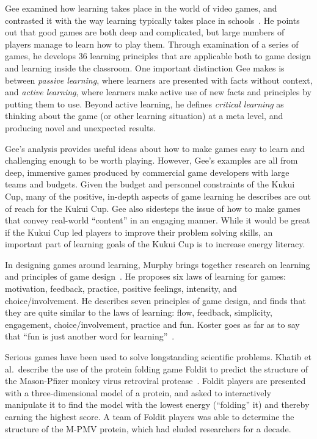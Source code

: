 Gee examined how learning takes place in the world of video games, and contrasted it with the way learning typically takes place in schools~\cite{Gee2007}. He points out that good games are both deep and complicated, but large numbers of players manage to learn how to play them. Through examination of a series of games, he develops 36 learning principles that are applicable both to game design and learning inside the classroom. One important distinction Gee makes is between \emph{passive learning}, where learners are presented with facts without context, and \emph{active learning}, where learners make active use of new facts and principles by putting them to use. Beyond active learning, he defines \emph{critical learning} as thinking about the game (or other learning situation) at a meta level, and producing novel and unexpected results.

Gee's analysis provides useful ideas about how to make games easy to learn and challenging enough to be worth playing. However, Gee's examples are all from deep, immersive games produced by commercial game developers with large teams and budgets. Given the budget and personnel constraints of the Kukui Cup, many of the positive, in-depth aspects of game learning he describes are out of reach for the Kukui Cup. Gee also sidesteps the issue of how to make games that convey real-world ``content'' in an engaging manner. While it would be great if the Kukui Cup led players to improve their problem solving skills, an important part of learning goals of the Kukui Cup is to increase energy literacy.

In designing games around learning, Murphy brings together research on learning and principles of game design~\cite{Murphy2011}. He proposes six laws of learning for games: motivation, feedback, practice, positive feelings, intensity, and choice/involvement. He describes seven principles of game design, and finds that they are quite similar to the laws of learning: flow, feedback, simplicity, engagement, choice/involvement, practice and fun. Koster goes as far as to say that ``fun is just another word for learning''~\cite{Koster-theory-of-fun}.

Serious games have been used to solve longstanding scientific problems. Khatib et al.\ describe the use of the protein folding game Foldit to predict the structure of the Mason-Pfizer monkey virus retroviral protease~\cite{Khatib2011}. Foldit players are presented with a three-dimensional model of a protein, and asked to interactively manipulate it to find the model with the lowest energy (``folding'' it) and thereby earning the highest score. A team of Foldit players was able to determine the structure of the M-PMV protein, which had eluded researchers for a decade.

